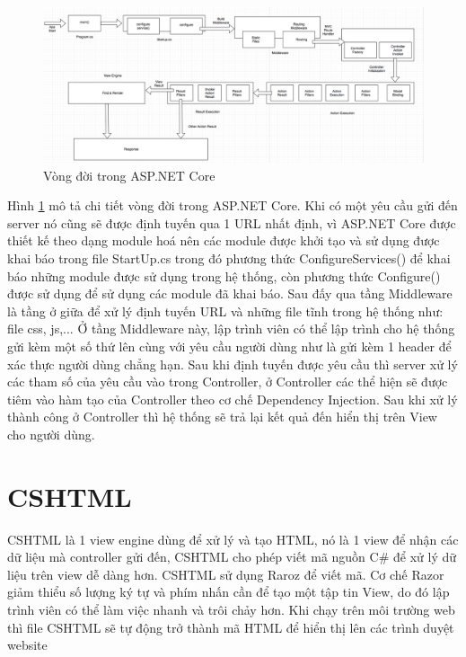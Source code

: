 \begin{center}
    \begin{figure}[h]
    \begin{center}
     \includegraphics[scale=0.6]{image/vongdoiCore.png}
    \end{center}
    \caption{Vòng đời trong ASP.NET Core}
    \label{refhinh2_6}
    \end{figure}
\end{center}
\par
Hình \ref{refhinh2_6} mô tả chi tiết vòng đời trong ASP.NET Core. Khi có một yêu cầu gửi đến server nó cũng sẽ được định tuyến qua 1 URL nhất định, vì ASP.NET Core được thiết kế theo dạng module hoá nên các module được khởi tạo và sử dụng được khai báo trong file StartUp.cs trong đó phương thức ConfigureServices() để khai báo những module được sử dụng trong hệ thống, còn phương thức Configure() được sử dụng để sử dụng các module đã khai báo. Sau đấy qua tầng Middleware là tầng ở giữa để xử lý định tuyến URL và những file tĩnh trong hệ thống như: file css, js,... Ở tầng Middleware này, lập trình viên có thể lập trình cho hệ thống gửi kèm một số thứ lên cùng với yêu cầu người dùng như là gửi kèm 1 header để xác thực người dùng chẳng hạn. Sau khi định tuyến được yêu cầu thì server xử lý các tham số của yêu cầu vào trong Controller, ở Controller các thể hiện sẽ được tiêm vào hàm tạo của Controller theo cơ chế Dependency Injection. Sau khi xử lý thành công ở Controller thì hệ thống sẽ trả lại kết quả đến hiển thị trên View cho người dùng. 
\section{CSHTML}
CSHTML là 1 view engine dùng để xử lý và tạo HTML, nó là 1 view để nhận các dữ liệu mà controller gửi đến, CSHTML cho phép viết mã nguồn C\# để xử lý dữ liệu trên view dễ dàng hơn. CSHTML sử dụng Raroz để viết mã. Cơ chế Razor giảm thiểu số lượng ký tự và phím nhấn cần để tạo một tập tin View, do đó lập trình viên có thể làm việc nhanh và trôi chảy hơn. Khi chạy trên môi trường web thì file CSHTML sẽ tự động trở thành mã HTML để hiển thị lên các trình duyệt website
